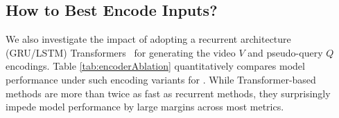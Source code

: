 
\subsection{How to Best Encode Inputs?}
\label{ablation:encoder}
We also investigate the impact of adopting a recurrent architecture (GRU/LSTM) \vs Transformers~\cite{vaswani_attention_2017} for generating the video $V$ and pseudo-query $Q$ encodings. Table \ref{tab:encoderAblation} quantitatively compares model performance under such encoding variants for \modelname.
While Transformer-based methods are more than twice as fast as recurrent methods, they surprisingly impede model performance by large margins across most metrics.
